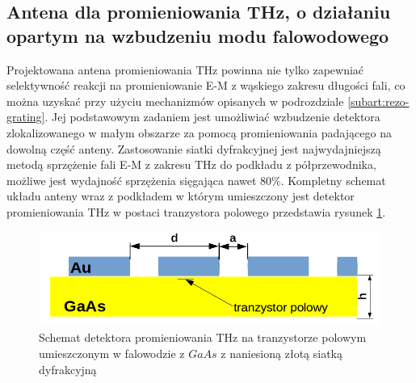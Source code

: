 \subsection{Antena dla promieniowania THz, o działaniu opartym na wzbudzeniu modu falowodowego}
\label{subart:antenaThz}
Projektowana antena promieniowania THz powinna nie tylko zapewniać selektywność reakcji na promieniowanie E-M z wąskiego zakresu długości fali, co można uzyskać przy użyciu mechanizmów opisanych w podrozdziale \ref{subart:rezo-grating}. Jej podstawowym zadaniem jest umożliwiać wzbudzenie detektora zlokalizowanego w małym obszarze za pomocą promieniowania padającego na dowolną część anteny. Zastosowanie siatki dyfrakcyjnej jest  najwydajniejszą metodą sprzężenie fali E-M z zakresu THz do podkładu z półprzewodnika, możliwe jest wydajność sprzężenia sięgająca nawet 80\%\cite{roux2002grating}.  Kompletny schemat układu anteny wraz z podkładem w którym umieszczony jest detektor promieniowania THz w postaci tranzystora polowego przedstawia rysunek \ref{fig:schem-podklad-falo}.
\begin{figure}
	\centering
	\includegraphics[width=\textwidth]{images/thz/schemat-podklad-falo.png}
	\caption{Schemat detektora promieniowania THz na tranzystorze polowym umieszczonym w falowodzie z $GaAs$ z naniesioną złotą siatką dyfrakcyjną}
	\label{fig:schem-podklad-falo}
\end{figure}

